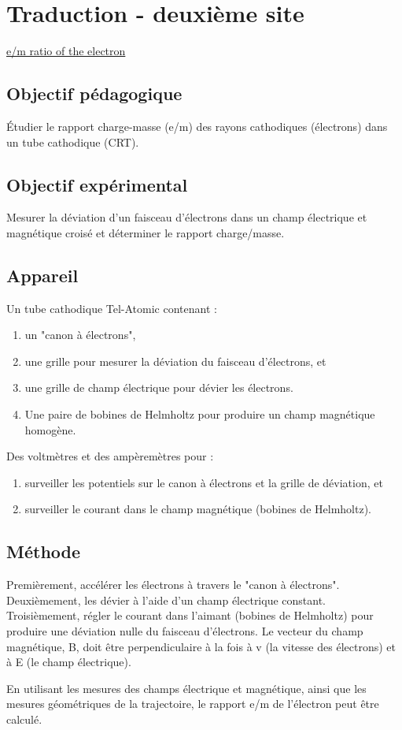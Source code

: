 \documentclass[../main.tex]{subfiles}
\begin{document}
\section{Traduction - deuxième site }

\href{https://physicsx.erau.edu/HelmholtzCoils/Lab_MP_1.pdf}{e/m ratio of the electron}
    
\subsection{Objectif pédagogique}
Étudier le rapport charge-masse (e/m) des rayons cathodiques (électrons) dans un tube cathodique (CRT). 
\subsection{Objectif expérimental}
Mesurer la déviation d'un faisceau d'électrons dans un champ électrique et magnétique croisé et déterminer le rapport charge/masse.  
\subsection{Appareil}
Un tube cathodique Tel-Atomic contenant :
\begin{enumerate}
    \item un "canon à électrons", 
    \item une grille pour mesurer la déviation du faisceau d'électrons, et 
    \item une grille de champ électrique pour dévier les électrons. 
    \item Une paire de bobines de Helmholtz pour produire un champ magnétique homogène.   
\end{enumerate}
Des voltmètres et des ampèremètres pour : \\
\begin{enumerate}
    \item surveiller les potentiels sur le canon à électrons et la grille de déviation, et
    \item surveiller le courant dans le champ magnétique (bobines de Helmholtz).
\end{enumerate}
\subsection{Méthode}
Premièrement, accélérer les électrons à travers le "canon à électrons".  \\
Deuxièmement, les dévier à l'aide d'un champ électrique constant.  
Troisièmement, régler le courant dans l'aimant (bobines de Helmholtz) pour produire une déviation nulle du faisceau d'électrons.  Le vecteur du champ magnétique, B, doit être perpendiculaire à la fois à v (la vitesse des électrons) et à E (le champ électrique).\\
\par En utilisant les mesures des champs électrique et magnétique, ainsi que les mesures géométriques de la trajectoire, le rapport e/m de l'électron peut être calculé.
\end{document}

